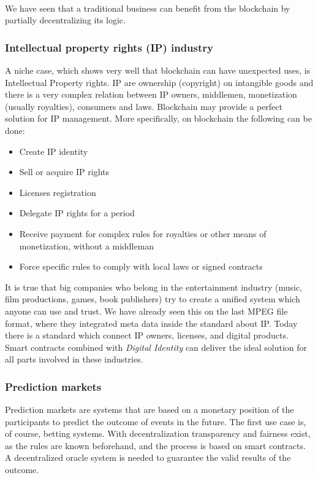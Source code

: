 \documentclass{article}
\begin{document}
\paragraph{}
We have seen that a traditional business can benefit from the blockchain by partially decentralizing its logic.

\subsubsection{Intellectual property rights (IP) industry}
A niche case, which shows very well that blockchain can have unexpected uses, is Intellectual Property rights. IP are ownership (copyright) on intangible goods and there is a very complex relation between IP owners, middlemen, monetization (usually royalties), consumers and laws. Blockchain may provide a perfect solution for IP management. More specifically, on blockchain the following can be done:
\begin{itemize}
\item Create IP identity
\item Sell or acquire IP rights
\item Licenses registration
\item Delegate IP rights for a period 
\item Receive payment for complex rules for royalties or other means of monetization, without a middleman
\item Force specific rules to comply with local laws or signed contracts
\end{itemize}
It is true that big companies who belong in the entertainment industry (music, film productions, games, book publishers) try to create a unified system which anyone can use and trust. We have already seen this on the last MPEG file format, where they integrated meta data inside the standard about IP. Today there is a standard which connect IP owners, licenses, and digital products. Smart contracts combined with \emph{Digital Identity} can deliver the ideal solution for all parts involved in these industries.
 
\subsubsection{Prediction markets}
Prediction markets are systems that are based on a monetary position of the participants to predict the outcome of events in the future. The first use case is, of course, betting systems. With decentralization transparency and fairness exist, as the rules are known beforehand, and the process is based on smart contracts. A decentralized oracle system is needed to guarantee the valid results of the outcome.
\end{document}
